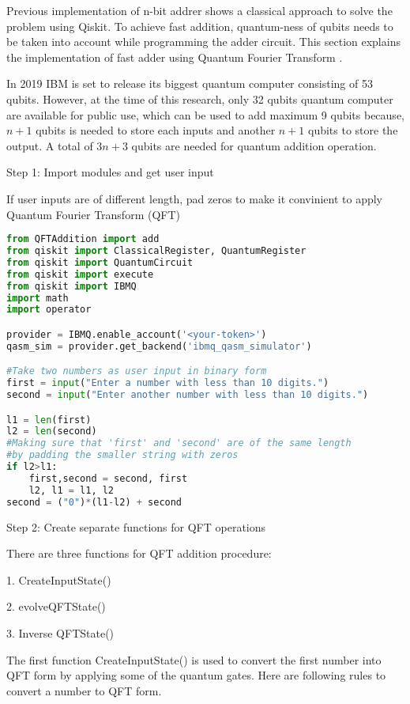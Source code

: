 \documentclass{cpp}
\begin{document}
Previous implementation of n-bit addrer shows a classical approach to solve the problem using Qiskit. To achieve fast addition, quantum-ness of qubits needs to be taken into account while programming the adder circuit. This section explains the implementation of fast adder using Quantum Fourier Transform \cite{sashwat_fast_adder}.

In 2019 IBM is set to release its biggest quantum computer consisting of 53 qubits. However, at the time of this research, only 32 qubits quantum computer are available for public use, which can be used to add maximum 9 qubits because, $n+1$ qubits is needed to store each inputs and another $n+1$ qubits to store the output. A total of $3n+3$ qubits are needed for quantum addition operation. 

\newpage
Step 1: Import modules and get user input

If user inputs are of different length, pad zeros to make it convinient to apply Quantum Fourier Transform (QFT)

\begin{lstlisting}[language=Python]
from QFTAddition import add
from qiskit import ClassicalRegister, QuantumRegister
from qiskit import QuantumCircuit
from qiskit import execute
from qiskit import IBMQ
import math
import operator

provider = IBMQ.enable_account('<your-token>')
qasm_sim = provider.get_backend('ibmq_qasm_simulator')

#Take two numbers as user input in binary form   
first = input("Enter a number with less than 10 digits.")
second = input("Enter another number with less than 10 digits.")

l1 = len(first)
l2 = len(second)
#Making sure that 'first' and 'second' are of the same length 
#by padding the smaller string with zeros
if l2>l1:
    first,second = second, first
    l2, l1 = l1, l2
second = ("0")*(l1-l2) + second
\end{lstlisting}

\newpage
Step 2: Create separate functions for QFT operations

There are three functions for QFT addition procedure:

1.	CreateInputState()

2.	evolveQFTState()

3.	Inverse QFTState()

The first function CreateInputState() is used to convert the first number into QFT form by applying some of the quantum gates. Here are following rules to convert a number to QFT form.
\end{document}
